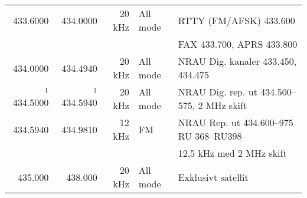 \begin{landscape}
\begin{tabular}{rrrll}
	         433.6000 &      434.0000 &      20 kHz & All mode        & RTTY (FM/AFSK) 433.600                            \\
	                  &               &             &                 & FAX 433.700, APRS 433.800                         \\ \hline
	         434.0000 &      434.4940 &      20 kHz & All mode        & NRAU Dig. kanaler 433.450, 434.475                \\ \hline
	    $^1$ 434.5000 & $^1$ 434.5940 &      20 kHz & All mode        & NRAU Dig. rep. ut 434.500--575, 2 MHz skift       \\ \hline
	         434.5940 &      434.9810 &      12 kHz & FM              & NRAU Rep. ut 434.600--975 RU 368--RU398           \\
	                  &               &             &                 & 12,5 kHz med 2 MHz skift                          \\ \hline
	          435.000 &       438.000 &      20 kHz & All mode        & Exklusivt satellit
\end{tabular}

\end{landscape}
